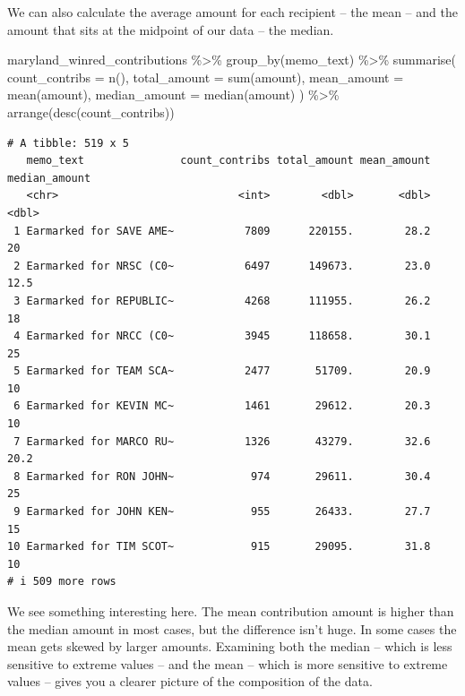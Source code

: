 \documentclass[
  letterpaper,
  DIV=11,
  numbers=noendperiod]{scrreprt}
\newenvironment{Shaded}{\begin{snugshade}}{\end{snugshade}}
\newcommand{\AttributeTok}[1]{\textcolor[rgb]{0.40,0.45,0.13}{#1}}
\newcommand{\FunctionTok}[1]{\textcolor[rgb]{0.28,0.35,0.67}{#1}}
\newcommand{\NormalTok}[1]{\textcolor[rgb]{0.00,0.23,0.31}{#1}}
\newcommand{\SpecialCharTok}[1]{\textcolor[rgb]{0.37,0.37,0.37}{#1}}
\begin{document}
We can also calculate the average amount for each recipient -- the mean
-- and the amount that sits at the midpoint of our data -- the median.

\begin{Shaded}
\begin{Highlighting}[]
\NormalTok{maryland\_winred\_contributions }\SpecialCharTok{\%\textgreater{}\%}
  \FunctionTok{group\_by}\NormalTok{(memo\_text) }\SpecialCharTok{\%\textgreater{}\%}
  \FunctionTok{summarise}\NormalTok{(}
    \AttributeTok{count\_contribs =} \FunctionTok{n}\NormalTok{(),}
    \AttributeTok{total\_amount =} \FunctionTok{sum}\NormalTok{(amount),}
    \AttributeTok{mean\_amount =} \FunctionTok{mean}\NormalTok{(amount),}
    \AttributeTok{median\_amount =} \FunctionTok{median}\NormalTok{(amount)}
\NormalTok{  ) }\SpecialCharTok{\%\textgreater{}\%}
  \FunctionTok{arrange}\NormalTok{(}\FunctionTok{desc}\NormalTok{(count\_contribs))}
\end{Highlighting}
\end{Shaded}

\begin{verbatim}
# A tibble: 519 x 5
   memo_text               count_contribs total_amount mean_amount median_amount
   <chr>                            <int>        <dbl>       <dbl>         <dbl>
 1 Earmarked for SAVE AME~           7809      220155.        28.2          20  
 2 Earmarked for NRSC (C0~           6497      149673.        23.0          12.5
 3 Earmarked for REPUBLIC~           4268      111955.        26.2          18  
 4 Earmarked for NRCC (C0~           3945      118658.        30.1          25  
 5 Earmarked for TEAM SCA~           2477       51709.        20.9          10  
 6 Earmarked for KEVIN MC~           1461       29612.        20.3          10  
 7 Earmarked for MARCO RU~           1326       43279.        32.6          20.2
 8 Earmarked for RON JOHN~            974       29611.        30.4          25  
 9 Earmarked for JOHN KEN~            955       26433.        27.7          15  
10 Earmarked for TIM SCOT~            915       29095.        31.8          10  
# i 509 more rows
\end{verbatim}

We see something interesting here. The mean contribution amount is
higher than the median amount in most cases, but the difference isn't
huge. In some cases the mean gets skewed by larger amounts. Examining
both the median -- which is less sensitive to extreme values -- and the
mean -- which is more sensitive to extreme values -- gives you a clearer
picture of the composition of the data.
\end{document}

